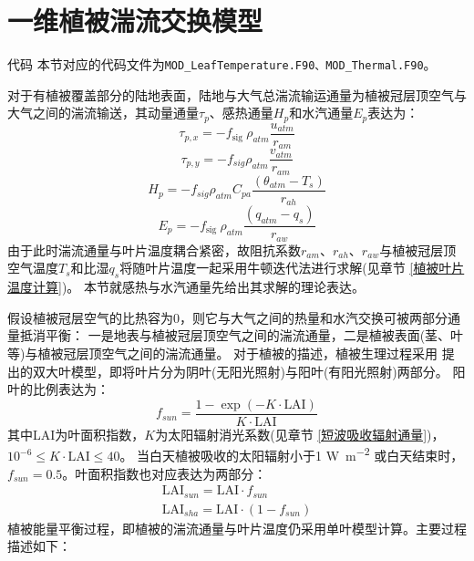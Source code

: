 \section{一维植被湍流交换模型}\label{一维植被湍流交换模型}
\begin{mymdframed}{代码}
本节对应的代码文件为\texttt{MOD\_LeafTemperature.F90、MOD\_Thermal.F90}。
\end{mymdframed}

对于有植被覆盖部分的陆地表面，陆地与大气总湍流输运通量为植被冠层顶空气与大气之间的湍流输送，其动量通量$\tau_p$、感热通量$H_p$和水汽通量$E_p$表达为：
\begin{equation}
\tau_{p, x}=-f_{\text {sig }} \rho_{atm} \frac{u_{atm}}{r_{a m}}
\end{equation}
\begin{equation}
\tau_{p, y}=-f_{sig} \rho_{atm} \frac{v_{atm}}{r_{a m}}
\end{equation}
\begin{equation}
H_{p}=-f_{sig} \rho_{atm} C_{p a} \frac{\left(\theta_{atm}-T_{s}\right)}{r_{a h}}
\end{equation}
\begin{equation}
E_{p}=-f_{\text {sig }} \rho_{atm} \frac{\left(q_{atm}-q_{s}\right)}{r_{a w}}
\end{equation}
由于此时湍流通量与叶片温度耦合紧密，故阻抗系数$r_{am}$、$r_{ah}$、$r_{aw}$与植被冠层顶空气温度$T_s$和比湿$q_s$将随叶片温度一起采用牛顿迭代法进行求解(见章节 \ref{植被叶片温度计算})。
本节就感热与水汽通量先给出其求解的理论表达。


假设植被冠层空气的比热容为0，则它与大气之间的热量和水汽交换可被两部分通量抵消平衡：
一是地表与植被冠层顶空气之间的湍流通量，二是植被表面(茎、叶等)与植被冠层顶空气之间的湍流通量。
对于植被的描述，植被生理过程采用 \citet{dai2004two}提出的双大叶模型，即将叶片分为阴叶(无阳光照射)与阳叶(有阳光照射)两部分。
阳叶的比例表达为：
\begin{equation}
f_{sun}=\frac{1-\exp (-K \cdot \text {LAI})}{K \cdot \text {LAI}}
\end{equation}
其中LAI为叶面积指数，$K$为太阳辐射消光系数(见章节 \ref{短波吸收辐射通量})，${10}^{-6}\le K \cdot \text {LAI}\le40$。
当白天植被吸收的太阳辐射小于1 \unit{W.m^{-2}} 或白天结束时，$f_{sun}=0.5$。叶面积指数也对应表达为两部分：
\begin{equation}
\begin{array}{c} \text {LAI}_{sun}= \text {LAI} \cdot f_{sun} \\ \text {LAI}_{sha}=\text {LAI} \cdot \left(1-f_{sun}\right)\end{array}
\end{equation}
植被能量平衡过程，即植被的湍流通量与叶片温度仍采用单叶模型计算。主要过程描述如下：


